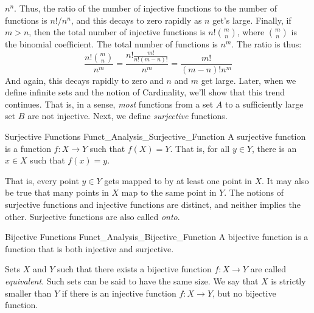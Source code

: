 \documentclass[crop=false,class=book,oneside]{standalone}
\begin{document}
            $n^{n}$. Thus, the ratio of the number of injective
            functions to the number of functions is
            $n!/n^{n}$, and this decays to zero rapidly as
            $n$ get's large. Finally, if $m>n$, then the total
            number of injective functions is
            $n!\binom{m}{n}$, where $\binom{m}{n}$ is the
            binomial coefficient. The total number of functions
            is $n^{m}$. The ratio is thus:
            \begin{equation}
                \frac{n!\binom{m}{n}}{n^{m}}=
                \frac{n!\frac{m!}{n!(m-n)!}}{n^{m}}
                =\frac{m!}{(m-n)!n^{m}}
            \end{equation}
            And again, this decays rapidly to zero and $n$ and $m$
            get large. Later, when we define infinite sets
            and the notion of Cardinality, we'll show that this
            trend continues. That is, in a sense, \textit{most}
            functions from a set $A$ to a sufficiently large set
            $B$ are not injective. Next, we define
            \textit{surjective} functions.
            \begin{ldefinition}{Surjective Functions}
                  {Funct_Analysis_Surjective_Function}
                A \gls{surjective function} is a function
                $f:X\rightarrow{Y}$ such that $f(X)=Y$.
                That is, for all $y\in{Y}$, there is an
                $x\in{X}$ such that $f(x)=y$.
            \end{ldefinition}
            That is, every point $y\in{Y}$ gets mapped to by
            at least one point in $X$. It may also be true that
            many points in $X$ map to the same point in $Y$.
            The notions of surjective functions and injective
            functions are distinct, and neither implies the
            other. Surjective functions are also called
            \textit{onto}.
            \begin{ldefinition}{Bijective Functions}
                  {Funct_Analysis_Bijective_Function}
                A \gls{bijective function} is a function
                that is both injective and surjective.
            \end{ldefinition}
            Sets $X$ and $Y$ such that there
            exists a bijective function $f:X\rightarrow{Y}$ are
            called \textit{equivalent}. Such sets can be said
            to have the same size. We say that $X$ is strictly
            smaller than $Y$ if there is an injective function
            $f:X\rightarrow{Y}$, but no bijective function.
\end{document}
